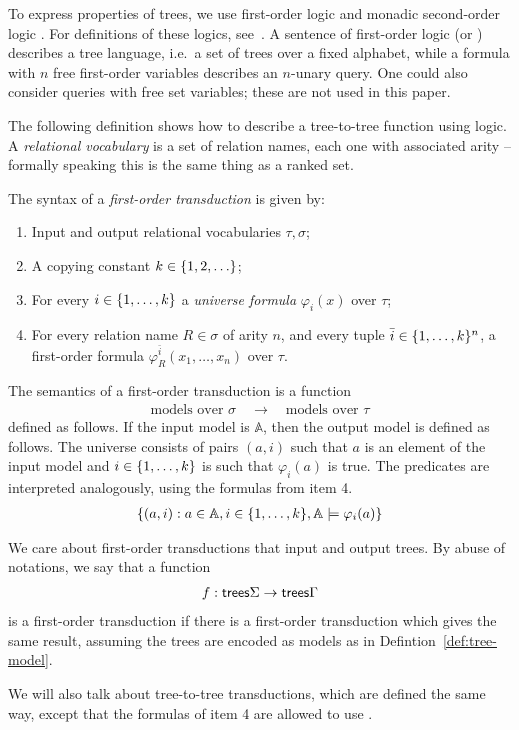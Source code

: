  To express properties of trees, we use first-order logic and monadic second-order logic \mso. For definitions of these logics, see~\cite[Section 3]{thomas1997languages}.
 A sentence of first-order logic (or \mso) describes a tree language, i.e.~a set of trees over a fixed alphabet, while a formula with $n$ free first-order variables describes an $n$-unary query.  One could also consider queries with free set variables; these are not used in this paper.

The following definition shows how to describe  a tree-to-tree function using logic. A \emph{relational vocabulary} is a set of relation names, each one with associated arity -- formally speaking this is the same thing as a ranked set. 

\begin{definition}\label{def:fo-transduction}
    The syntax of a \emph{first-order transduction}  is given by:
\begin{enumerate}
    \item Input and output relational vocabularies $\tau,\sigma$;
    \item A copying constant $k \in \{1,2,\ldots\}$;
    \item For every $i \in \{1,\ldots,k\}$ a \emph{universe formula} $\varphi_i(x)$ over $\tau$;
    \item For every relation name $R \in \sigma$ of arity $n$, and every tuple $\bar i \in \{1,\ldots,k\}^n$, a first-order formula $\varphi_R^{\bar i}(x_1,\ldots,x_n)$ over $\tau$.
\end{enumerate}
\end{definition}

The semantics of a first-order transduction is  a function
\begin{align*}
    \text{models over $\sigma$} \quad \to \quad \text{models over $\tau$}
\end{align*}
defined as follows. If the input model is $\mathbb A$, then the output model is defined as follows. The universe consists of pairs $(a,i)$ such that $a$ is an element of the input model and $i \in \{1,\ldots,k\}$ is such that $\varphi_i(a)$ is true. The predicates are interpreted analogously, using the formulas from item 4. 
\begin{align*}
    \{(a,i) : a \in \mathbb A, i \in \{1,\ldots,k\} , \mathbb A \models \varphi_i(a)\}
\end{align*}

We care about first-order transductions that input and output trees. By abuse of notations, we say that a  function 
    \begin{align*}
        f : \mathsf {trees} \Sigma \to \mathsf {trees} \Gamma
    \end{align*}
    is  a first-order transduction if there is a first-order transduction which gives the same result, assuming the trees are encoded as models as in Defintion~\ref{def:tree-model}.   

    We will also talk about \mso tree-to-tree transductions, which are defined the same way, except that the formulas of item 4 are allowed to use \mso. 
